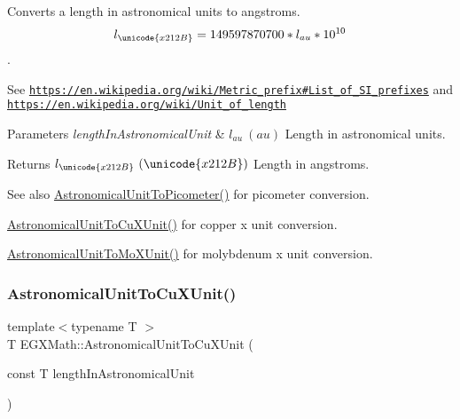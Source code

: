 Converts a length in astronomical units to angstroms. \[ l_{\unicode{x212B}}=149597870700 * l_{au} * 10^{10} \]. 

See \href{https://en.wikipedia.org/wiki/Metric_prefix#List_of_SI_prefixes}{\tt https\+://en.\+wikipedia.\+org/wiki/\+Metric\+\_\+prefix\#\+List\+\_\+of\+\_\+\+S\+I\+\_\+prefixes} and \href{https://en.wikipedia.org/wiki/Unit_of_length}{\tt https\+://en.\+wikipedia.\+org/wiki/\+Unit\+\_\+of\+\_\+length} 
\begin{DoxyParams}{Parameters}
{\em length\+In\+Astronomical\+Unit} & $ l_{au}\ (au)$ Length in astronomical units. \\
\hline
\end{DoxyParams}
\begin{DoxyReturn}{Returns}
$ l_{\unicode{x212B}}\ (\unicode{x212B})$ Length in angstroms. 
\end{DoxyReturn}
\begin{DoxySeeAlso}{See also}
\mbox{\hyperlink{group___e_g_x_math-_conversions-_length_conversions-_astronomical-_astronomical_unit-_s_i_gaf512b8f1ace4be83fbeb252b447405d6}{Astronomical\+Unit\+To\+Picometer()}} for picometer conversion. 

\mbox{\hyperlink{group___e_g_x_math-_conversions-_length_conversions-_astronomical-_astronomical_unit-_non-_s_i_ga00eedd6324f9a6b31af3ae3fa14ca644}{Astronomical\+Unit\+To\+Cu\+X\+Unit()}} for copper x unit conversion. 

\mbox{\hyperlink{group___e_g_x_math-_conversions-_length_conversions-_astronomical-_astronomical_unit-_non-_s_i_ga8b3dc85e14d6129ebfa2f6336d63bf9c}{Astronomical\+Unit\+To\+Mo\+X\+Unit()}} for molybdenum x unit conversion. 
\end{DoxySeeAlso}
\mbox{\label{group___e_g_x_math-_conversions-_length_conversions-_astronomical-_astronomical_unit-_non-_s_i_ga00eedd6324f9a6b31af3ae3fa14ca644}} 
\subsubsection{\texorpdfstring{Astronomical\+Unit\+To\+Cu\+X\+Unit()}{AstronomicalUnitToCuXUnit()}}
{\footnotesize\ttfamily template$<$typename T $>$ \\
T E\+G\+X\+Math\+::\+Astronomical\+Unit\+To\+Cu\+X\+Unit (\begin{DoxyParamCaption}\item[{const T}]{length\+In\+Astronomical\+Unit }\end{DoxyParamCaption})}



